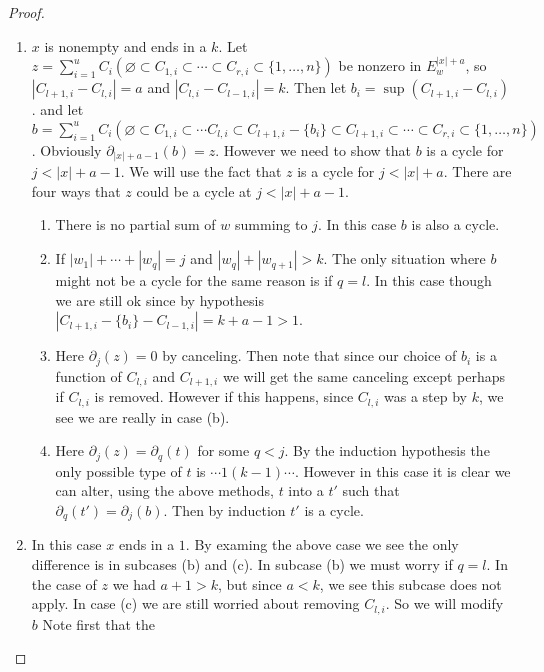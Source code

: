 \documentclass{amsart}
\begin{document}
\begin{proof}
\begin{enumerate}
 	\item $x$ is nonempty and ends in a $k$. Let $z = \sum_{i=1}^u C_i (\varnothing \subset 
        C_{1,i} \subset 
        \cdots \subset C_{r,i} \subset \{1, \ldots, n\})$ be nonzero in $E^{|x|+a}_w$, so 
        $|C_{l+1, i} - C_{l, i}| = a$ and $|C_{l, i} - C_{l-1, i}| = k$.  Then let 
        $b_i = \sup(C_{l+1,i}-C_{l, i})$.
        and let $b = \sum_{i=1}^u C_i (\varnothing \subset C_{1,i} \subset \cdots C_{l,i} 
        \subset C_{l+1,i} - \{b_i\} \subset C_{l+1, i} \subset \cdots \subset C_{r,i} \subset 
        \{1, \ldots, n\})$. Obviously $\partial_{|x|+a-1}(b) = z$. However we need to show that 
        $b$
        is a cycle for $j < |x|+a-1$. We will use the fact that $z$ is a cycle for $j < 
        |x|+a$. 
   	  There are four ways that $z$ could be a cycle at $j < |x|+a-1$.
	  \begin{enumerate}
          \item There is no partial sum of $w$ summing to $j$. In this case $b$ is also a cycle.
          \item If $|w_1| + \cdots + |w_q| = j$ and $|w_q|+|w_{q+1}| > k$. The only situation 
            where $b$ might not be a cycle for the same reason is if $q = l$. In this case though
            we are still ok since by hypothesis $|C_{l+1, i} - \{b_i\} - C_{l-1, i}| = k+a-1 > 1$.
          \item Here $\partial_j(z) = 0$ by canceling. Then note that since our choice of $b_i$ is
            a function of $C_{l,i}$ and $C_{l+1, i}$ we will get the same canceling except perhaps
            if $C_{l, i}$ is removed. However if this happens, since $C_{l, i}$ was a step by $k$,
            we see we are really in case (b).
          \item Here $\partial_j(z) = \partial_q(t)$ for some $q < j$. By the induction hypothesis the only possible type
            of $t$ is $\cdots 1 (k-1) \cdots$. However in this case it is clear we can alter, using the above methods, 
            $t$ into a $t'$ such that $\partial_{q}(t') = \partial_j (b)$. Then by induction $t'$ is a cycle.
        \end{enumerate}
      \item In this case $x$ ends in a $1$. By examing the above case we see the only difference 
        is in subcases (b) and (c). In subcase (b) we must worry if $q = l$. In the case of $z$ 
        we had $a + 1 > k$, but since $a < k$, we see this subcase does not apply. In case (c) we
        are still worried about removing $C_{l, i}$. So we will modify $b$ Note first that the 

\end{enumerate}
\end{proof}
\end{document}
